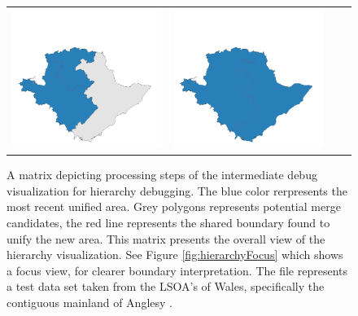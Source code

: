 \begin{figure}[p]
\begin{tabularx}{1\textwidth}{XXXX}
\includegraphics[width=1\linewidth]{images/ch6/mergeoverall/23}&
\includegraphics[width=1\linewidth]{images/ch6/mergeoverall/24} \\ %
\end{tabularx}
\caption{A matrix depicting processing steps of the intermediate debug visualization for hierarchy debugging. The blue color rerpresents the most recent unified area. Grey polygons represents potential merge candidates, the red line represents the shared boundary found to unify the new area. This matrix presents the overall view of the hierarchy visualization. See Figure \ref{fig:hierarchyFocus} which shows a focus view, for clearer boundary interpretation. The file represents a test data set taken from the LSOA's of Wales, specifically the contiguous mainland of Anglesy \cite{wales}.} \label{fig:hierarchyOverall}
\end{figure}

